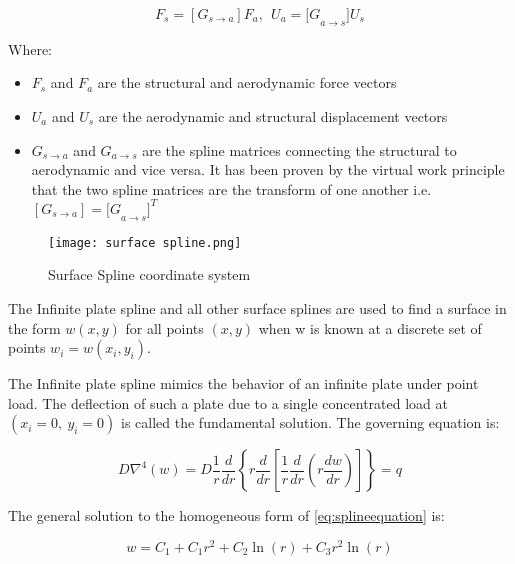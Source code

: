 \begin{equation}
F_{s} = \left\lbrack G_{s \rightarrow a} \right\rbrack F_{a},\ \ U_{a} = {\lbrack G}_{a \rightarrow s}\rbrack U_{s}
\end{equation}


Where:

\begin{itemize}
\item
  $F_{s}$ and $F_{a}$ are the structural and aerodynamic force
  vectors
\item
  $U_{a}$ and $U_{s}$ are the aerodynamic and structural
  displacement vectors
\item
  $G_{s \rightarrow a}$ and $G_{a \rightarrow s}$ are the spline
  matrices connecting the structural to aerodynamic and vice versa. It
  has been proven by the virtual work principle that the two spline
  matrices are the transform of one another i.e.
  $\left\lbrack G_{s \rightarrow a} \right\rbrack = {{\lbrack G}_{a \rightarrow s}\rbrack}^{T}$
\end{itemize}

\begin{figure}[H]
  \centering
  \texttt{[image: surface spline.png]}
  \caption{Surface Spline coordinate system \cite{msc2021}}
\end{figure}

The Infinite plate spline and all other surface splines are used to find
a surface in the form $w(x,y)$ for all points $(x,y)$ when w is
known at a discrete set of points
$w_{i} = w\left( x_{i},y_{i} \right)$.

The Infinite plate spline mimics the behavior of an infinite plate under
point load. The deflection of such a plate due to a single concentrated
load at $\left( x_{i} = 0,\ y_{i} = 0 \right)$ is called the
fundamental solution. The governing equation is:



\begin{equation}
D\nabla^{4}(w) = D\frac{1}{r}\frac{d}{dr}\left\{ r\frac{d}{dr}\left\lbrack \frac{1}{r}\frac{d}{dr}\left( r\frac{dw}{dr} \right) \right\rbrack \right\} = q
\label{eq:splineequation}
\end{equation}



The general solution to the homogeneous form of \autoref{eq:splineequation} is:

\begin{equation}
w = C_{1} + C_{1}r^{2} + C_{2}\ln(r) + C_{3}r^{2}\ln(r)
\end{equation}

